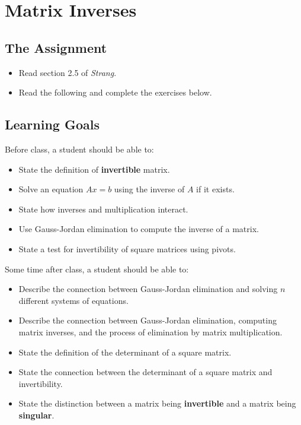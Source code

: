 \documentclass[10pt,]{book}
\newcommand{\terminology}[1]{\textbf{#1}}
\theoremstyle{plain}
\numberwithin{equation}{section}
\begin{document}
\section[Matrix Inverses]{Matrix Inverses}\label{inverse}
\typeout{************************************************}
\typeout{************************************************}
\subsection[The Assignment]{The Assignment}\label{subsection-41}
\begin{itemize}
\item{}Read section 2.5 of \emph{Strang}.\item{}Read the following and complete the exercises below.\end{itemize}
\typeout{************************************************}
\typeout{************************************************}
\subsection[Learning Goals]{Learning Goals}\label{subsection-42}

      Before class, a student should be able to:
\begin{itemize}
\item{}State the definition of \terminology{invertible} matrix.\item{}Solve an equation \(Ax = b\) using the inverse of \(A\)
        if it exists.
      \item{}State how inverses and multiplication interact.\item{}Use Gauss-Jordan elimination to compute the inverse of a matrix.\item{}State a test for invertibility of square matrices using pivots.\end{itemize}
\par

      Some time after class, a student should be able to:
\begin{itemize}
\item{}Describe the connection between Gauss-Jordan elimination and solving
        \(n\) different systems of equations.
      \item{}Describe the connection between Gauss-Jordan elimination, computing
        matrix inverses, and the process of elimination by matrix multiplication.
      \item{}State the definition of the determinant of a square matrix.\item{}State the connection between the determinant of a square matrix and
        invertibility.\item{}State the distinction between a matrix being \terminology{invertible}
        and a matrix being \terminology{singular}.
      \end{itemize}
\typeout{************************************************}
\typeout{************************************************}
\end{document}
